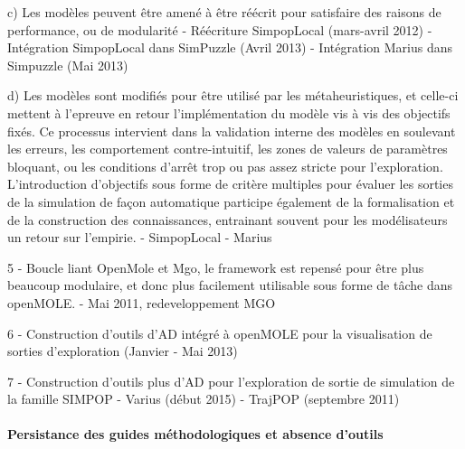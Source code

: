 	c) Les modèles peuvent être amené à être réécrit pour satisfaire des raisons de performance, ou de modularité
		- Réécriture SimpopLocal (mars-avril 2012)
		- Intégration SimpopLocal dans SimPuzzle (Avril 2013)
		- Intégration Marius dans Simpuzzle (Mai 2013)

	d) Les modèles sont modifiés pour être utilisé par les métaheuristiques, et celle-ci mettent à l'epreuve en retour l'implémentation du modèle vis à vis des objectifs fixés. Ce processus intervient dans la validation interne des modèles en soulevant les erreurs, les comportement contre-intuitif, les zones de valeurs de paramètres bloquant, ou les conditions d'arrêt trop ou pas assez stricte pour l'exploration. L'introduction d'objectifs sous forme de critère multiples pour évaluer les sorties de la simulation de façon automatique participe également de la formalisation et de la construction des connaissances, entrainant souvent pour les modélisateurs un retour sur l'empirie.
		- SimpopLocal \autocites{Schmitt2014,Schmitt2015}
		- Marius \autocite{Cottineau2014b}

5 - Boucle liant OpenMole et Mgo, le framework est repensé pour être plus beaucoup modulaire, et donc plus facilement utilisable sous forme de tâche dans openMOLE. 
	- Mai 2011, redeveloppement MGO

6 - Construction d'outils d'AD intégré à openMOLE pour la visualisation de sorties d'exploration (Janvier - Mai 2013)

7 - Construction d'outils plus d'AD pour l'exploration de sortie de simulation de la famille SIMPOP 
	- Varius (début 2015)
	- TrajPOP (septembre 2011)



\paragraph{Persistance des guides méthodologiques et absence d'outils}


